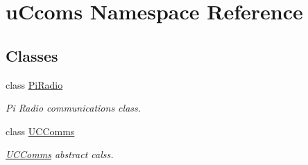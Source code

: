 \hypertarget{namespaceu_ccoms}{}\section{u\+Ccoms Namespace Reference}
\label{namespaceu_ccoms}
\subsection*{Classes}
\begin{DoxyCompactItemize}
\item 
class \mbox{\hyperlink{classu_ccoms_1_1_pi_radio}{Pi\+Radio}}
\begin{DoxyCompactList}\small\item\em Pi Radio communications class. \end{DoxyCompactList}\item 
class \mbox{\hyperlink{classu_ccoms_1_1_u_c_comms}{U\+C\+Comms}}
\begin{DoxyCompactList}\small\item\em \mbox{\hyperlink{classu_ccoms_1_1_u_c_comms}{U\+C\+Comms}} abstract calss. \end{DoxyCompactList}\end{DoxyCompactItemize}
